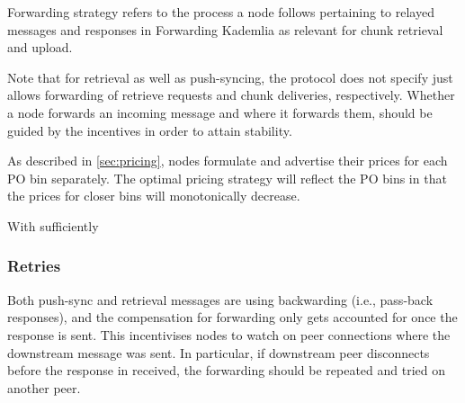 Forwarding strategy refers to the process a node follows pertaining to relayed messages and responses in Forwarding Kademlia as relevant for chunk retrieval and upload.

Note that for retrieval as well as push-syncing, the protocol does not specify just allows forwarding of retrieve requests and chunk deliveries, respectively.
Whether a node forwards an incoming message and where it forwards them, should be guided by the incentives in order to attain stability.

As described in \ref{sec:pricing}, nodes  formulate and  advertise their prices for each PO bin separately. 
The optimal pricing strategy will reflect the PO bins in that the prices for closer bins will monotonically decrease. 

With sufficiently 
    
 
\subsubsection{Retries}

Both push-sync and retrieval messages are using backwarding (i.e., pass-back responses), and the compensation for forwarding only gets accounted for once the response is sent. This incentivises nodes to watch on peer connections where the downstream message was sent. In particular, if downstream peer disconnects  before the response in received, the forwarding should be repeated and tried on another peer.









